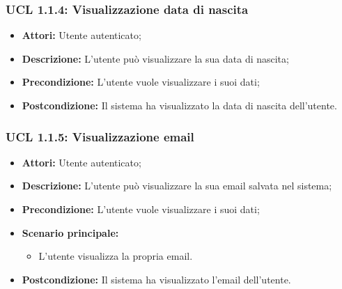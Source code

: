 \hypertarget{L1.1.4}{}
\subsubsection{UCL 1.1.4: Visualizzazione data di nascita}
\begin{itemize}
	\item \textbf{Attori:} Utente autenticato;
	\item \textbf{Descrizione:} L'utente può visualizzare la sua data di nascita;
	\item \textbf{Precondizione:} L'utente vuole visualizzare i suoi dati;
	\item \textbf{Postcondizione:} Il sistema ha visualizzato la data di nascita dell'utente.
\end{itemize}

\hypertarget{L1.1.5}{}
\subsubsection{UCL 1.1.5: Visualizzazione email}
\begin{itemize}
	\item \textbf{Attori:} Utente autenticato;
	\item \textbf{Descrizione:} L'utente può visualizzare la sua email salvata nel sistema;
	\item \textbf{Precondizione:} L'utente vuole visualizzare i suoi dati;
	\item \textbf{Scenario principale:}
	\begin{itemize}
	 \item L'utente visualizza la propria email.
	\end{itemize}
	\item \textbf{Postcondizione:} Il sistema ha visualizzato l'email dell'utente.
\end{itemize}

 
\hypertarget{L1.2}{}
